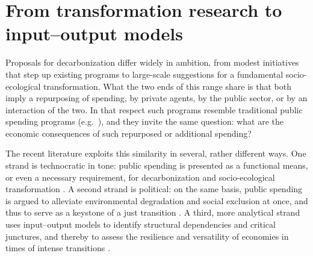 \section{From transformation research to input--output models}\label{sec:io-bridge}

Proposals for decarbonization differ widely in ambition, from modest initiatives that step up existing programs to large-scale suggestions for a fundamental socio-ecological transformation. What the two ends of this range share is that both imply a repurposing of spending, by private agents, by the public sector, or by an interaction of the two. In that respect such programs resemble traditional public spending programs (e.g.\ \citealp{Pollin.2015, Mazzucato.2013}), and they invite the same question: what are the economic consequences of such repurposed or additional spending?

The recent literature exploits this similarity in several, rather different ways. One strand is technocratic in tone: public spending is presented as a functional means, or even a necessary requirement, for decarbonization and socio-ecological transformation \citep{Mazzucato.2013, Mazzucato.2018}. A second strand is political: on the same basis, public spending is argued to alleviate environmental degradation and social exclusion at once, and thus to serve as a keystone of a just transition \citep{NewellMulvaney.2013}. A third, more analytical strand uses input--output models to identify structural dependencies and critical junctures, and thereby to assess the resilience and versatility of economies in times of intense transitions \citep{Farmer.2024, BF2019, Acemoglu.2012}. 

